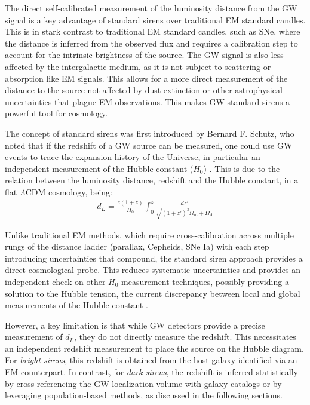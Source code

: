 The direct self-calibrated measurement of the luminosity distance from the \ac{GW} signal is a key advantage of standard sirens over traditional \ac{EM} standard candles. This is in stark contrast to traditional \ac{EM} standard candles, such as \ac{SNe}, where the distance is inferred from the observed flux and requires a calibration step to account for the intrinsic brightness of the source. The \ac{GW} signal is also less affected by the intergalactic medium, as it is not subject to scattering or absorption like \ac{EM} signals. This allows for a more direct measurement of the distance to the source not affected by dust extinction or other astrophysical uncertainties that plague \ac{EM} observations. This makes \ac{GW} standard sirens a powerful tool for cosmology.

The concept of standard sirens was first introduced by Bernard F. Schutz, who noted that if the redshift of a \ac{GW} source can be measured, one could use \ac{GW} events to trace the  expansion history of the Universe, in particular an independent measurement of the Hubble constant ($H_0$) \citep{schutz1986determining}. This is due to the relation between the luminosity distance, redshift and the Hubble constant, in a flat \(\Lambda\)CDM cosmology, being:
\begin{align}
    d_L = \frac{c(1+z)}{H_0} \int_0^z \frac{dz'}{\sqrt{(1+z')^3\Omega_m + \Omega_\Lambda}}
\end{align}

Unlike traditional \ac{EM} methods, which require cross-calibration across multiple rungs of the distance ladder (parallax, Cepheids, SNe Ia) with each step introducing uncertainties that compound, the standard siren approach provides a direct cosmological probe. This reduces systematic uncertainties and provides an independent check on other $H_0$ measurement techniques, possibly providing a solution to the Hubble tension, the current discrepancy between local and global measurements of the Hubble constant \citep{Riess:2019cxk,Planck:2018vyg}.

However, a key limitation is that while \ac{GW} detectors provide a precise measurement of $d_L$, they do not directly measure the redshift. This necessitates an independent redshift measurement to place the source on the Hubble diagram. For \textit{bright sirens}, this redshift is obtained from the host galaxy identified via an \ac{EM} counterpart. In contrast, for \textit{dark sirens}, the redshift is inferred statistically by cross-referencing the \ac{GW} localization volume with galaxy catalogs or by leveraging population-based methods, as discussed in the following sections.

